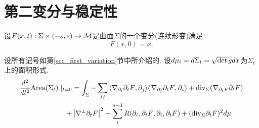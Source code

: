 \section{第二变分与稳定性}
设$F(x,t): \Sigma \times (-\varepsilon, \varepsilon) \to {\mathcal{M}}$是曲面$\Sigma$的一个变分(连续形变)满足
\begin{equation}
    F(x,0)=x.
\end{equation}
\begin{theorem}
设所有记号如第\eqref{sec_first_variation}节中所介绍的.  设${d\mu_t}=d\Sigma_t=\sqrt{\det g}dx$为$\Sigma_t$上的面积形式. 
    \begin{equation} \label{second_variation}
        \begin{split}
            \frac{d^2}{dt^2} \text{Area}(\Sigma_t)\mid_{t=0} & = \int_\Sigma -\sum_{ij}{\left < \nabla_{{\partial_i}}{\partial_t F}, {\partial_j} \right >}{\left < \nabla_{{\partial_j}}{\partial_t F}, {\partial_i} \right >} +{\text{div}}_{\Sigma}(\nabla_{{\partial_t F}}{\partial_t F}) \\
            +& \left | \nabla^\perp {\partial_t F} \right |^2 - \sum_{i}^{n-1}R({\partial_i},{\partial_t F},{\partial_i},{\partial_t F}) + ({\text{div}}_\Sigma{\partial_t F})^2{d\mu}
        \end{split}
    \end{equation}
\end{theorem}
